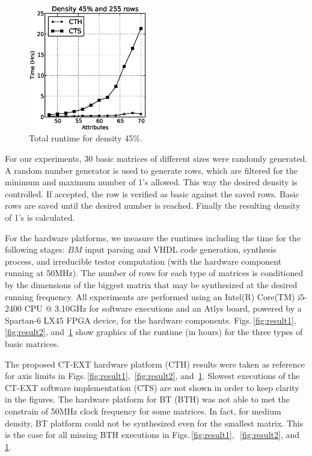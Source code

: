 \documentclass[authoryear,preprint,review,12pt]{elsarticle}
\begin{document}
\begin{figure}[htb]
    \begin{center}
       \includegraphics[height=5.5cm]{med48_density.eps}
    \end{center}
\caption{Total runtime for density 45\%.}
\label{fig:result3}
\end{figure}


For our experiments, 30 basic matrices of different sizes were randomly generated. 
A random number generator is used to generate rows, which are
filtered for the minimum and maximum number of 1's allowed. This way the desired density is
controlled. If accepted, the row is verified as basic against the saved rows. Basic rows 
are saved until the desired number is reached. Finally the resulting 
density of 1's is calculated.

For the hardware platforms, we measure the runtimes including the time for the following stages: $BM$ input parsing 
and VHDL code generation, synthesis process, and irreducible testor computation (with the hardware 
component running at 50MHz). The number of rows for each type of matrices is conditioned by the dimensions of 
the biggest matrix that may be synthesized at the desired running frequency.
All experiments are performed using an Intel(R) Core(TM) i5-2400 CPU @ 3.10GHz for software executions and 
an Atlys board, powered by a Spartan-6 LX45 FPGA device, for the hardware components.
Figs.\,\ref{fig:result1}, \,\ref{fig:result2}, and \,\ref{fig:result3} show graphics of the runtime (in hours) 
for the three types of basic matrices. 

The proposed CT-EXT hardware platform (CTH) results were taken as reference for axis limits in 
Figs.\,\ref{fig:result1}, \,\ref{fig:result2}, and \,\ref{fig:result3}.
Slowest executions of the CT-EXT software implementation (CTS) are not shown in order to keep clarity in 
the figures. 
The hardware platform for BT (BTH) was not able to met the constrain of 50MHz clock frequency for some 
matrices. In fact, for medium  density, BT platform could not be synthesized even for the smallest matrix. 
This is the case for all missing BTH executions in Figs.\,\ref{fig:result1},~\,\ref{fig:result2}, and~\,\ref{fig:result3}.
\end{document}
